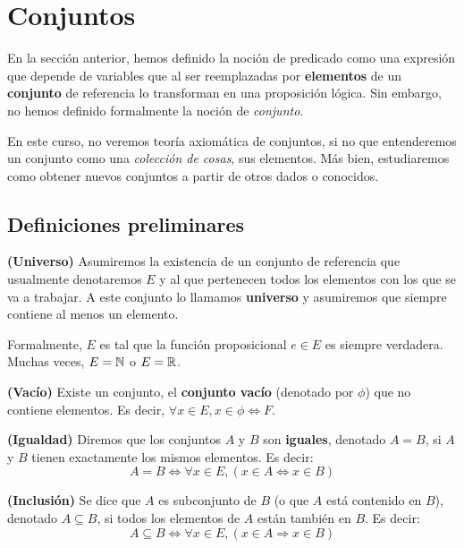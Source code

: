 
\section{Conjuntos}

En la sección anterior, hemos definido la noción de predicado como una expresión que depende de variables que al ser reemplazadas por \textbf{elementos} de un \textbf{conjunto} de referencia lo transforman en una proposición lógica. Sin embargo, no hemos definido formalmente la noción de \textit{conjunto}. 

En este curso, no veremos teoría axiomática de conjuntos, si no que entenderemos un conjunto como una \textit{colección de cosas}, sus elementos. Más bien, estudiaremos como obtener nuevos conjuntos a partir de otros dados o conocidos. 

\subsection{Definiciones preliminares}

\begin{definicion}
	\textbf{(Universo)}
	Asumiremos la existencia de un conjunto de referencia que usualmente denotaremos $E$ y al que pertenecen todos los elementos con los que se va a trabajar. A este conjunto lo llamamos \textbf{universo} y asumiremos que siempre contiene al menos un elemento. 
	
	Formalmente, $E$ es tal que la función proposicional $e\in E$ es siempre verdadera. Muchas veces, $E = \mathbb{N}$ o $E = \mathbb{R}$. 
\end{definicion}

\begin{definicion}
	\textbf{(Vacío)}
	Existe un conjunto, el \textbf{conjunto vacío} (denotado por $\phi$) que no contiene elementos. Es decir, $\forall x \in E, x \in \phi \iff F$. 
\end{definicion}

\begin{definicion}
	\textbf{(Igualdad)}
	Diremos que los conjuntos $A$ y $B$ son \textbf{iguales}, denotado $A=B$, si $A$ y $B$ tienen exactamente los mismos elementos. Es decir: 
	$$ A = B \iff \forall x \in E, (x \in A \iff x \in B ) $$ 
\end{definicion}

\begin{definicion}
	\textbf{(Inclusión)}
	Se dice que $A$ es subconjunto de $B$ (o que $A$ está contenido en $B$), denotado $A\subseteq B$, si todos los elementos de $A$ están también en $B$. Es decir: 
	$$ A \subseteq B \iff \forall x \in E, (x \in A \Longrightarrow x \in B) $$ 
\end{definicion}


